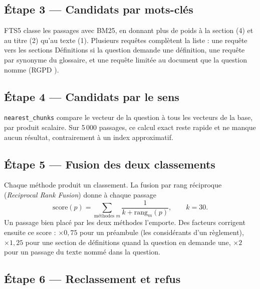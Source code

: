 \documentclass[11pt,a4paper]{article}
\begin{document}
\subsection{Étape 3 --- Candidats par mots-clés}

FTS5 classe les passages avec BM25, en donnant plus de poids à la section (4) et au titre (2) qu'au texte (1). Plusieurs requêtes complètent la liste : une requête vers les sections \og Définitions \fg{} si la question demande une définition, une requête par synonyme du glossaire, et une requête limitée au document que la question nomme (\og RGPD \fg).


\subsection{Étape 4 --- Candidats par le sens}

\texttt{nearest\_chunks} compare le vecteur de la question à tous les vecteurs de la base, par produit scalaire. Sur 5\,000 passages, ce calcul exact reste rapide et ne manque aucun résultat, contrairement à un index approximatif.

\subsection{Étape 5 --- Fusion des deux classements}

Chaque méthode produit un classement. La fusion par rang réciproque (\emph{Reciprocal Rank Fusion}) donne à chaque passage
\[
\text{score}(p) = \sum_{\text{méthodes } m} \frac{1}{k + \text{rang}_m(p)}, \qquad k = 30.
\]
Un passage bien placé par les deux méthodes l'emporte. Des facteurs corrigent ensuite ce score : \(\times 0{,}75\) pour un préambule (les considérants d'un règlement), \(\times 1{,}25\) pour une section de définitions quand la question en demande une, \(\times 2\) pour un passage du texte nommé dans la question.


\subsection{Étape 6 --- Reclassement et refus}
\end{document}
